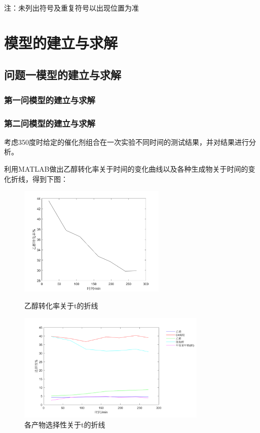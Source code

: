 \documentclass[a4paper,10.5pt]{ctexart}
\begin{document}
注：未列出符号及重复符号以出现位置为准
\section{模型的建立与求解}
\subsection{问题一模型的建立与求解}
\subsubsection{第一问模型的建立与求解}

\subsubsection{第二问模型的建立与求解}

考虑350度时给定的催化剂组合在一次实验不同时间的测试结果，并对结果进行分析。

利用MATLAB做出乙醇转化率关于时间的变化曲线以及各种生成物关于时间的变化折线，得到下图：
\begin{figure}[h]
\centering
\begin{minipage}[t]{0.45\textwidth}
\centering
\includegraphics[width=7cm]{乙醇转化率.png}
\caption{乙醇转化率关于t的折线}
\end{minipage}
\begin{minipage}[t]{0.54\textwidth}
\centering
\includegraphics[width=9cm]{选择性与时间.png}
\caption{各产物选择性关于t的折线}
\end{minipage}
\end{figure}
\end{document}
